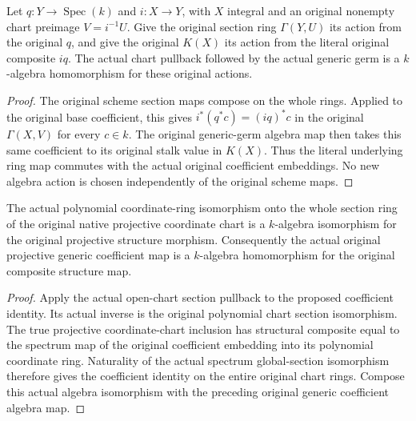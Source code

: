 \begin{theorem}
\label{thm:seven-original-closed-chart-coefficient-algebra-route}
\leanok
{}
Let $q:Y\to\operatorname{Spec}(k)$ and $i:X\to Y$, with $X$ integral
and an original nonempty chart preimage $V=i^{-1}U$. Give the original
section ring $\Gamma(Y,U)$ its action from the original $q$, and give
the original $K(X)$ its action from the literal original composite
$iq$. The actual chart pullback followed by the actual generic germ
is a $k$-algebra homomorphism for these original actions.
\end{theorem}
\begin{proof}
The original scheme section maps compose on the whole rings.
Applied to the original base coefficient, this gives
$i^*(q^*c)=(iq)^*c$ in the original $\Gamma(X,V)$ for every $c\in k$.
The original generic-germ algebra map then takes this same coefficient
to its original stalk value in $K(X)$. Thus the literal underlying ring
map commutes with the actual original coefficient embeddings. No new
algebra action is chosen independently of the original scheme maps.
\end{proof}

\begin{theorem}
\label{thm:seven-original-projective-chart-coefficient-algebra-route}
\leanok
{}
The actual polynomial coordinate-ring isomorphism onto the whole
section ring of the original native projective coordinate chart is a
$k$-algebra isomorphism for the original projective structure morphism.
Consequently the actual original projective generic coefficient map
is a $k$-algebra homomorphism for the original composite structure map.
\end{theorem}
\begin{proof}
Apply the actual open-chart section pullback to the proposed coefficient
identity. Its actual inverse is the original polynomial chart section
isomorphism. The true projective coordinate-chart inclusion has
structural composite equal to the spectrum map of the original
coefficient embedding into its polynomial coordinate ring. Naturality
of the actual spectrum global-section isomorphism therefore gives
the coefficient identity on the entire original chart rings. Compose
this actual algebra isomorphism with the preceding original generic
coefficient algebra map.
\end{proof}

